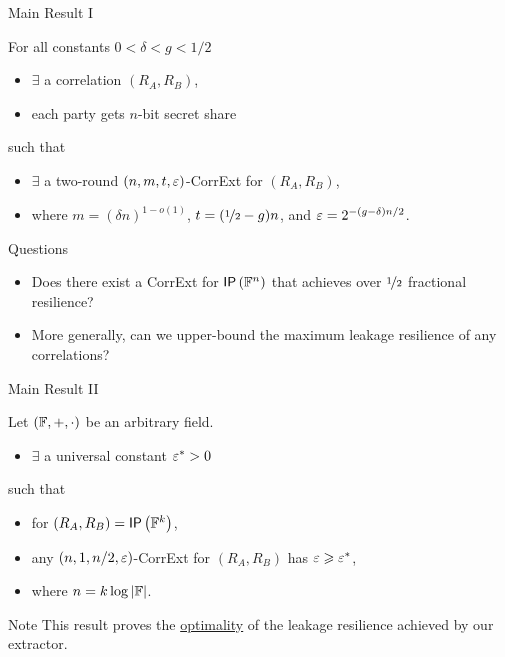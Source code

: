 \begin{frame}{Main Result I}
	\begin{theorem}
	\label{thm:construction}
	For all constants $0<\delta<g<1/2$
	\begin{itemize}
		\item $ \exists $ a correlation $(R_A,R_B)$, 
		\item each party gets $n$-bit secret share
	\end{itemize}
	such that 
	\begin{itemize}
		\item $ \exists $ a two-round $(n,m,t,\varepsilon)$-CorrExt for $(R_A,R_B)$,
		\item where $m=(\delta n)^{1-o(1)}$, \pause $t=(\nicefrac12-g)n$, \pause and $\varepsilon=2^{-(g-\delta)n/2}$.
	\end{itemize} 
	\end{theorem}
	\pause
	{
	\begin{block}{Questions}
		\begin{itemize}
		\item Does there exist a CorrExt for $ \IP[\bbF^n] $ that achieves over $ \nicefrac{1}{2} $ fractional resilience? \pause
		\item More generally, can we upper-bound the maximum leakage resilience of any correlations? 
		\end{itemize}
	\end{block}
	}
\end{frame}

\begin{frame}{Main Result II}
	\begin{theorem}
	\label{thm:hardness} 
	Let $({\mathbb F},+,\cdot)$ be an arbitrary field.
	\begin{itemize}
		\item $ \exists $ a universal constant $\varepsilon^*>0$
	\end{itemize}
	such that
	\begin{itemize}
		\item  for $(R_A,R_B)=\IP [\bbF^k] $, %
		\item any $(n,1,%
		n/2,\eps)$-CorrExt for $(R_A,R_B)$ has $\varepsilon\geqslant\varepsilon^*$,
		\item  where $n=k\log\left\vert{\ensuremath{{\mathbb F}}}\right\vert$.  
	\end{itemize}
\end{theorem}

{
\begin{block}{Note}
	This result proves the \underline{optimality} of the leakage resilience achieved by our extractor.
\end{block}}

\end{frame}